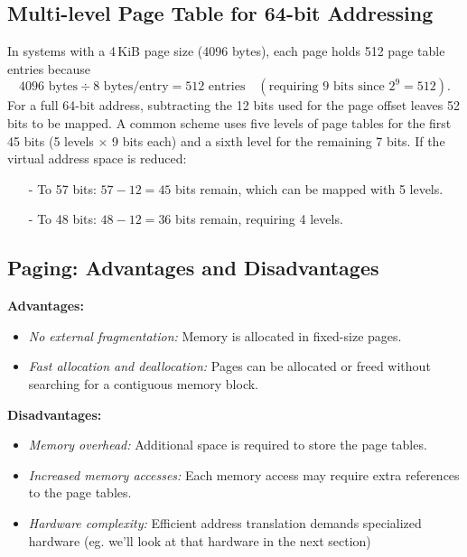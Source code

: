 \documentclass[../../compsys.tex]{subfiles}
\begin{document}
\subsection{Multi-level Page Table for 64-bit Addressing}
In systems with a 4\,KiB page size (4096 bytes), each page holds 512 page table entries because 
\[
4096 \text{ bytes} \div 8 \text{ bytes/entry} = 512 \text{ entries} \quad (\text{requiring } 9 \text{ bits since } 2^9 = 512).
\]
For a full 64-bit address, subtracting the 12 bits used for the page offset leaves 52 bits to be mapped. A common scheme uses five levels of page tables for the first 45 bits (5 levels $\times$ 9 bits each) and a sixth level for the remaining 7 bits. If the virtual address space is reduced:
\begin{itemize}
  \item[-] To 57 bits: $57 - 12 = 45$ bits remain, which can be mapped with 5 levels.
  \item[-] To 48 bits: $48 - 12 = 36$ bits remain, requiring 4 levels.
\end{itemize}

\subsection{Paging: Advantages and Disadvantages}
\textbf{Advantages:}
\begin{itemize}
    \item \emph{No external fragmentation:} Memory is allocated in fixed-size pages.
    \item \emph{Fast allocation and deallocation:} Pages can be allocated or freed without searching for a contiguous memory block.
\end{itemize}

\textbf{Disadvantages:}
\begin{itemize}
    \item \emph{Memory overhead:} Additional space is required to store the page tables.
    \item \emph{Increased memory accesses:} Each memory access may require extra references to the page tables.
    \item \emph{Hardware complexity:} Efficient address translation demands specialized hardware (eg. we'll look at that hardware in the next section)
  \end{itemize}
\end{document}
